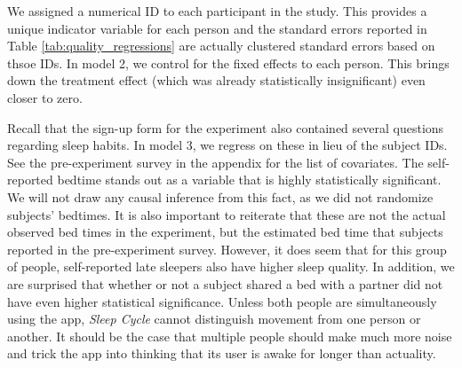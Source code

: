 \documentclass[]{article}
\begin{document}
We assigned a numerical ID to each participant in the study. This
provides a unique indicator variable for each person and the standard
errors reported in Table \ref{tab:quality_regressions} are actually
clustered standard errors based on thsoe IDs. In model 2, we control for
the fixed effects to each person. This brings down the treatment effect
(which was already statistically insignificant) even closer to zero.

Recall that the sign-up form for the experiment also contained several
questions regarding sleep habits. In model 3, we regress on these in
lieu of the subject IDs. See the pre-experiment survey in the appendix
for the list of covariates. The self-reported bedtime stands out as a
variable that is highly statistically significant. We will not draw any
causal inference from this fact, as we did not randomize subjects'
bedtimes. It is also important to reiterate that these are not the
actual observed bed times in the experiment, but the estimated bed time
that subjects reported in the pre-experiment survey. However, it does
seem that for this group of people, self-reported late sleepers also
have higher sleep quality. In addition, we are surprised that whether or
not a subject shared a bed with a partner did not have even higher
statistical significance. Unless both people are simultaneously using
the app, \emph{Sleep Cycle} cannot distinguish movement from one person
or another. It should be the case that multiple people should make much
more noise and trick the app into thinking that its user is awake for
longer than actuality.
\end{document}
